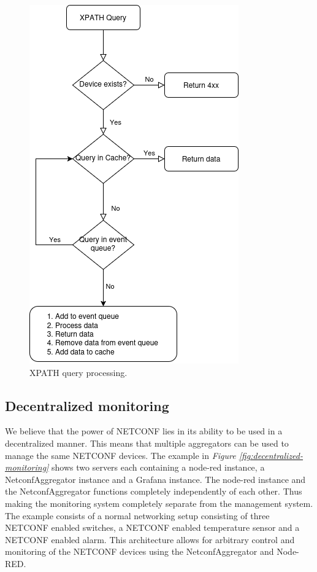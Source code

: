 \documentclass[12pt]{article}
\begin{document}
\begin{figure}
  \centering
  \includegraphics{xpathquery.drawio.png}
  \caption{XPATH query processing.}
  \label{fig:xpath-query}
\end{figure}


\newpage

\subsection{Decentralized monitoring}
We believe that the power of NETCONF lies in its ability to be used in a decentralized manner.
This means that multiple aggregators can be used to manage the same NETCONF devices. 
The example in \textit{Figure \ref{fig:decentralized-monitoring}} shows two servers each containing a node-red instance, a NetconfAggregator 
instance and a Grafana instance. The node-red instance and the NetconfAggregator functions completely independently of each other.
Thus making the monitoring system completely separate from the management system. The example consists of a normal networking setup
consisting of three NETCONF enabled switches, a NETCONF enabled temperature sensor and a NETCONF enabled alarm.
This architecture allows for arbitrary control and monitoring of the NETCONF devices using the NetconfAggregator and Node-RED.
\end{document}
